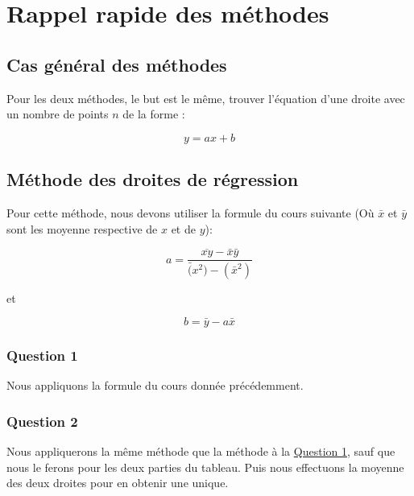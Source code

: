 \documentclass[letter]{article}
\date{\today}
\title{}
\begin{document}





\setcounter{tocdepth}{2}
\tableofcontents

\newpage

\section{Rappel rapide des méthodes}
\label{sec:org989b1f0}


\subsection{Cas général des méthodes}
\label{sec:org9f4a19b}

Pour les deux méthodes, le but est le même, trouver l'équation d'une droite avec un nombre de points \(n\) de la forme :


\[ y= ax + b  \]




\subsection{Méthode des droites de régression}
\label{sec:orgcc39515}

Pour cette méthode, nous devons utiliser la formule du cours suivante (Où \(\bar{x}\) et \(\bar{y}\) sont les moyenne respective de \(x\) et de \(y\)):

\[ a =\frac{\overline{xy}-\bar{x}\bar{y}}{\bar(x^2)-(\bar{x}^2)}  \]


et

\[ b= \bar{y}-a\bar{x}  \]



\subsubsection{Question 1}
\label{sec:org258d844}

Nous appliquons la formule du cours donnée précédemment.


\subsubsection{Question 2}
\label{sec:org9fcfce3}

Nous appliquerons la même méthode que la méthode à la \hyperref[sec:org258d844]{Question 1}, sauf que nous le ferons pour les deux parties du tableau.
Puis nous effectuons la moyenne des deux droites pour en obtenir une unique.
\end{document}
